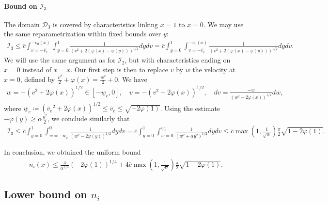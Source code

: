 \documentclass{article}
\numberwithin{equation}{section}
\newcommand{\ve}{{\overline{v}_e}} %
\newcommand{\we}{{\underline{w}_e}} %
\newcommand{\DomUpR}{{\mathcal{D}_2}} %
\newcommand{\DomLow}{{\mathcal{D}_3}} %
\newcommand{\IntUpR}{{\mathcal{I}_2}} %
\newcommand{\IntLow}{{\mathcal{I}_3}} %
\newcommand{\maxfe}{{\overline{c}}} %
\begin{document}
\paragraph{Bound on $\IntLow$}

The domain $\DomLow$ is covered by characteristics linking $x=1$ to $x=0$. We may use the same reparametrization within fixed bounds over $y$:
\begin{align*}
	\IntLow \leqslant \maxfe \int_{v=-\ve}^{-v_0(x)} \int_{y=0}^{1} \frac{1}{\left(v^2 + 2 \left(\varphi(x) - \varphi(y)\right)\right)^{1/2}} dy dv = \maxfe \int_{y=0}^{1} \int_{v=-\ve}^{-v_0(x)} \frac{1}{\left(v^2 + 2 \left(\varphi(x) - \varphi(y)\right)\right)^{1/2}} dy dv.
\end{align*}
We will use the same argument as for $\IntUpR$, but with characteristics ending on $x=0$ instead of $x=x$. Our first step is then to replace $v$ by $w$ the velocity at $x=0$, defined by $\frac{v^2}{2} + \varphi(x) = \frac{w^2}{2} + 0$. We have
\begin{align*}
	 w = - \left(v^2 + 2 \varphi(x)\right)^{1/2} \in [-\we, 0], \quad v = - \left(v^2 - 2 \varphi(x)\right)^{1/2}, \quad dv = \frac{-w}{\left(w^2-2\varphi(x)\right)^{1/2}} dw,
\end{align*}
where $\we \coloneqq \left(\ve^2 + 2 \varphi(x)\right)^{1/2} \leqslant \ve \leqslant \sqrt{-2\varphi(1)}$. Using the estimate $-\varphi(y) \geqslant \alpha \frac{y^2}{2}$, we conclude similarly that
\begin{align*}
	\IntLow 
	\leqslant \maxfe \int_{y=0}^{1} \int_{w=-\we}^{0} \frac{1}{\left(w^2 - 2\varphi(y)\right)^{1/2}} dy dv 
	= \maxfe \int_{y=0}^{1} \int_{w=0}^{\we} \frac{1}{\left(w^2 + \alpha y^2\right)^{1/2}} dy dv
	\leqslant \maxfe \max\left(1,\frac{1}{\sqrt{\alpha}}\right) \frac{\pi}{2} \sqrt{1 - 2 \varphi(1)}.
\end{align*}

In conclusion, we obtained the uniform bound
\begin{align*}
	n_i(x) \leqslant \frac{4}{\alpha^{1/4}} \left(-2\varphi(1)\right)^{1/4} + 4 \maxfe \max\left(1,\frac{1}{\sqrt{\alpha}}\right) \frac{\pi}{2} \sqrt{1 - 2 \varphi(1)}.
\end{align*}

\subsection{Lower bound on $n_i$}
\end{document}
